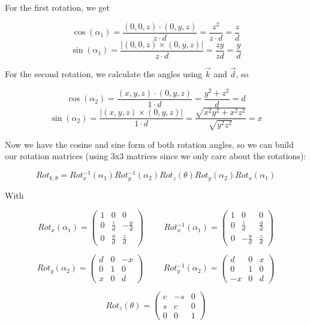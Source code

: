 \documentclass[a4paper,11pt]{article}
\begin{document}
\begin {enumerate}
		For the first rotation, we get

		$$\cos(\alpha_1) = \frac{(0,0,z) \cdot (0, y, z)}{z \cdot d} = \frac{z^2}{z \cdot d} = \frac{z}{d}$$
		$$\sin(\alpha_1) = \frac{|(0,0,z) \times(0, y, z)|}{z \cdot d} = \frac{zy}{zd} = \frac{y}{d}$$

		For the second rotation, we calculate the angles using $\vec{k}$ and $\vec{d}$, so

		$$\cos(\alpha_2) = \frac{(x,y,z) \cdot (0, y, z)}{1 \cdot d} = \frac{y^2 + z^2}{d} = d$$
		$$\sin(\alpha_2) = \frac{|(x,y,z) \times(0, y, z)|}{1 \cdot d} = \frac{\sqrt{x^2y^2+x^2z^2}}{\sqrt{y^2z^2}} = x$$

		Now we have the cosine and sine form of both rotation angles, so we can build
		our rotation matrices (using 3x3 matrices since we only care about the rotations):

		$$Rot_{k,\theta} =
			Rot^{-1}_x(\alpha_1)
			Rot^{-1}_y(\alpha_2)
			Rot_z(\theta)
			Rot_y(\alpha_2)
			Rot_x(\alpha_1)$$

		With

		$$Rot_x(\alpha_1) = \begin{pmatrix}
			1 & 0 & 0\\
			0 & \frac{z}{d} & -\frac{y}{d}\\
			0 & \frac{y}{d} & \frac{z}{d}
		\end{pmatrix}
		\hspace{1cm}
		Rot^{-1}_x(\alpha_1) = \begin{pmatrix}
			1 & 0 & 0\\
			0 & \frac{z}{d} & \frac{y}{d}\\
			0 & -\frac{y}{d} & \frac{z}{d}
		\end{pmatrix}$$

		$$Rot_y(\alpha_2) = \begin{pmatrix}
			d & 0 & -x\\
			0 & 1 & 0\\
			x & 0 & d
		\end{pmatrix}
		\hspace{1cm}
		Rot^{-1}_y(\alpha_2) = \begin{pmatrix}
			d & 0 & x\\
			0 & 1 & 0\\
			-x & 0 & d
		\end{pmatrix}$$

		$$Rot_z(\theta) = \begin{pmatrix}
			c & -s & 0\\
			s & c & 0\\
			0 & 0 & 1
		\end{pmatrix}$$


\end{enumerate}
\end{document}
